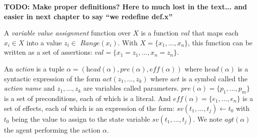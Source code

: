 \textbf{TODO: Make proper definitions? Here to much lost in the text... and easier in next chapter to say ``we redefine def.x''}

A \textit{variable value assignment} function over $X$ is a function $val$ that maps each $x_i \in X$ into a value $z_i \in$ $\textit{Range}(x_i)$. With $X = \{ x_1, ..., x_n \}$, this function can be written as a set of assertions: $val = \{ x_1=z_1, \ldots, x_n=z_n \}$. 

An \textit{action} is a tuple $\alpha = (\textit{head}(\alpha), \textit{pre}(\alpha), \textit{eff}(\alpha))$ where $\textit{head}(\alpha)$ is a syntactic expression of the form $\textit{act}(z_1, ..., z_k)$ where $act$ is a symbol called the \textit{action name} and $z_1,...,z_k$ are variables called parameters. $\textit{pre}(\alpha) = \{ p_1, ..., p_m \}$ is a set of preconditions, each of which is a literal. And $\textit{eff}(\alpha) = \{ e_1, ..., e_n \}$ is a set of effects, each of which is an expression of the form: $sv(t_1, ..., t_j) \leftarrow t_0$ with $t_0$ being the value to assign to the state variable $sv(t_1, ..., t_j)$. We note $\textit{agt}(\alpha)$ the agent performing the action $\alpha$.

